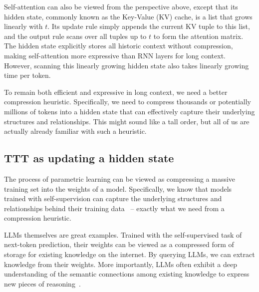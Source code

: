 \documentclass{article}
\begin{document}
Self-attention can also be viewed from the perspective above, except that its hidden state, commonly known as the Key-Value (KV) cache, is a list that grows linearly with $t$.
Its update rule simply appends the current KV tuple to this list, and the output rule scans over all tuples up to $t$ to form the attention matrix.
The hidden state explicitly stores all historic context without compression, making self-attention more expressive than RNN layers for long context.
However, scanning this linearly growing hidden state also takes linearly growing time per token.

To remain both efficient and expressive in long context, we need a better compression heuristic.
Specifically, we need to compress thousands or potentially millions of tokens into a hidden state that can effectively capture their underlying structures and relationships.
This might sound like a tall order, but all of us are actually already familiar with such a heuristic.

\subsection{TTT as updating a hidden state}
\label{subsec:hidden}

The process of parametric learning can be viewed as compressing a massive training set into the weights of a model.
Specifically, we know that models trained with self-supervision can capture the underlying structures and relationships behind their training data~\cite{le2013building} -- exactly what we need from a compression heuristic.

LLMs themselves are great examples. Trained with the self-supervised task of next-token prediction, their weights can be viewed as a compressed form of storage for existing knowledge on the internet.
By querying LLMs, we can extract knowledge from their weights.
More importantly, LLMs often exhibit a deep understanding of the semantic connections among existing knowledge to express new pieces of reasoning~\cite{achiam2023gpt}.
\end{document}
